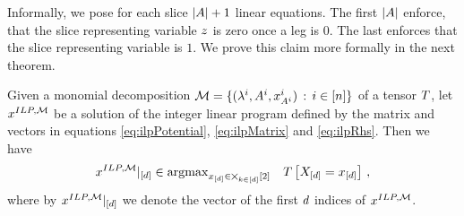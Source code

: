 Informally, we pose for each slice $\left|A\right|+1$ linear equations.
The first $\left|A\right|$ enforce, that the slice representing variable $z$ is zero once a leg is $0$.
The last enforces that the slice representing variable is $1$.
We prove this claim more formally in the next theorem.

\begin{theorem}
    Given a monomial decomposition $\mathcal{M}=\{(\lambda^{i}, A^{i}, x_{A^{i}}^{i}) \, : \, i\in[n]\}$ of a tensor $T$, let  $x^{ILP,\mathcal{M}}$ be a solution of the integer linear program defined by the matrix and vectors in equations \eqref{eq:ilpPotential}, \eqref{eq:ilpMatrix} and \eqref{eq:ilpRhs}.
    Then we have
    \[ {x^{ILP,\mathcal{M}}}|_{[d]} \in \mathrm{argmax}_{x_{[d]}\in\bigtimes_{k\in[d]}[2]} \quad T\left[X_{[d]}=x_{[d]}\right] \, ,\]
    where by  ${x^{ILP,\mathcal{M}}}|_{[d]}$ we denote the vector of the first $d$ indices of $x^{ILP,\mathcal{M}}$.
\end{theorem}
